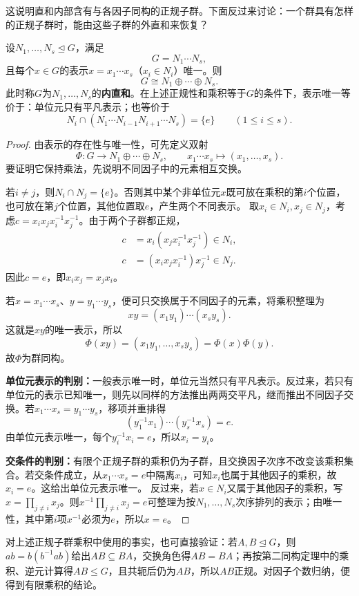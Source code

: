 这说明直和内部含有与各因子同构的正规子群。下面反过来讨论：一个群具有怎样的正规子群时，能由这些子群的外直和来恢复？

\begin{theorem}\label{p2:internal-product}
设$N_1,\ldots,N_s\trianglelefteq G$，满足
\[
G=N_1\cdots N_s,
\]
且每个$x\in G$的表示$x=x_1\cdots x_s$（$x_i\in N_i$）唯一。则
\[
G\cong N_1\oplus\cdots\oplus N_s.
\]
此时称$G$为$N_1,\ldots,N_s$的\textbf{内直和}。在上述正规性和乘积等于$G$的条件下，表示唯一等价于：单位元只有平凡表示；也等价于
\[
N_i\cap(N_1\cdots N_{i-1}N_{i+1}\cdots N_s)=\{e\}
\qquad(1\leq i\leq s).
\]
\end{theorem}
\begin{proof}
由表示的存在性与唯一性，可先定义双射
\[
\Phi:G\longrightarrow N_1\oplus\cdots\oplus N_s,
\qquad x_1\cdots x_s\longmapsto(x_1,\ldots,x_s).
\]
要证明它保持乘法，先说明不同因子中的元素相互交换。

若$i\ne j$，则$N_i\cap N_j=\{e\}$。否则其中某个非单位元$x$既可放在乘积的第$i$个位置，也可放在第$j$个位置，其他位置取$e$，产生两个不同表示。
取$x_i\in N_i,x_j\in N_j$，考虑$c=x_ix_jx_i^{-1}x_j^{-1}$。由于两个子群都正规，
\begin{align*}
c&=x_i(x_jx_i^{-1}x_j^{-1})\in N_i,\\
c&=(x_ix_jx_i^{-1})x_j^{-1}\in N_j.
\end{align*}
因此$c=e$，即$x_ix_j=x_jx_i$。

若$x=x_1\cdots x_s$、$y=y_1\cdots y_s$，便可只交换属于不同因子的元素，将乘积整理为
\[
xy=(x_1y_1)\cdots(x_sy_s).
\]
这就是$xy$的唯一表示，所以
\[
\Phi(xy)=(x_1y_1,\ldots,x_sy_s)=\Phi(x)\Phi(y).
\]
故$\Phi$为群同构。

\textbf{单位元表示的判别：}一般表示唯一时，单位元当然只有平凡表示。反过来，若只有单位元的表示已知唯一，则先以同样的方法推出两两交平凡，继而推出不同因子交换。若$x_1\cdots x_s=y_1\cdots y_s$，移项并重排得
\[
(y_1^{-1}x_1)\cdots(y_s^{-1}x_s)=e.
\]
由单位元表示唯一，每个$y_i^{-1}x_i=e$，所以$x_i=y_i$。

\textbf{交条件的判别：}有限个正规子群的乘积仍为子群，且交换因子次序不改变该乘积集合。若交条件成立，从$x_1\cdots x_s=e$中隔离$x_i$，可知$x_i$也属于其他因子的乘积，故$x_i=e$。这给出单位元表示唯一。
反过来，若$x\in N_i$又属于其他因子的乘积，写$x=\prod_{j\ne i}x_j$。则$x^{-1}\prod_{j\ne i}x_j=e$可整理为按$N_1,\ldots,N_s$次序排列的表示；由唯一性，其中第$i$项$x^{-1}$必须为$e$，所以$x=e$。
\end{proof}

对上述正规子群乘积中使用的事实，也可直接验证：若$A,B\trianglelefteq G$，则$ab=b(b^{-1}ab)$给出$AB\subseteq BA$，交换角色得$AB=BA$；再按第二同构定理中的乘积、逆元计算得$AB\leq G$，且共轭后仍为$AB$，所以$AB$正规。对因子个数归纳，便得到有限乘积的结论。

